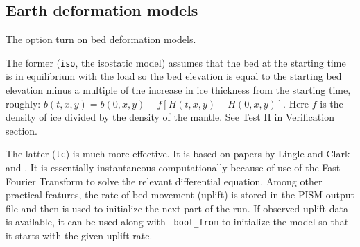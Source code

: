 \begin{comment}
  \optdef{mu_sliding}{0} The sliding law parameter in SIA regions of the ice.
  \emph{This kind of sliding is not recommended, which is why it is turned off
    by default. See} \texttt{-ssa} \emph{and} \texttt{-plastic} \emph{for the
    recommended sliding model.} This kind of sliding is used in experiments G
  and H of EISMINT II \cite{EISMINT00}, but note that executable \texttt{pisms
    -eisII} ignors this parameter and uses the right amount of sliding for the
  given experiment.
\end{comment}


\subsection{Earth deformation models} \label{subsect:beddef}  

The option  turn on bed deformation models.

The former (\texttt{iso}, the isostatic model) assumes that the bed at the starting time is in equilibrium with the load so the bed elevation is equal to the starting bed elevation minus a multiple of the increase in ice thickness from the starting time, roughly: $b(t,x,y) = b(0,x,y) - f [H(t,x,y) - H(0,x,y)]$.  Here $f$ is the density of ice divided by the density of the mantle.  See Test H in Verification section. 

The latter (\texttt{lc}) is much more effective.  It is based on papers by Lingle and Clark \cite{LingleClark}  and \cite{BLKfastearth}.  It is essentially instantaneous computationally because of use of the Fast Fourier Transform to solve the relevant differential equation.  Among other practical features, the rate of bed movement (uplift) is stored in the PISM output file and then is used to initialize the next part of the run.  If observed uplift data is available, it can be used along with \texttt{-boot_from} to initialize the model so that it starts with the given uplift rate.


